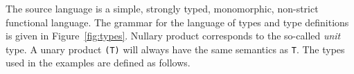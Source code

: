 \documentclass[11pt]{article}
\begin{document}
The source language is a simple, strongly typed, monomorphic,
non-strict functional language.  The grammar for the language of types
and type definitions is given in Figure~\ref{fig:types}.
Nullary product corresponds to the so-called {\it unit\/} type.  A
unary product \mbox{\tt (T)} will always have the same semantics as \mbox{\tt T}.  The
types used in the examples are defined as follows.
\begin{flushleft}
\vspace{-0.0em}\vspace{-0.0em}\\
\vspace{-0.0em}\\
\makebox{\progsize\tt }\vspace{-0.0em}\\
\vspace{-0.0em}\\
\vspace{-0.0em}
\end{flushleft}
\end{document}
